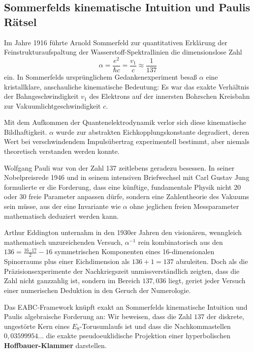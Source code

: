 \documentclass[11pt,a4paper]{article}
\theoremstyle{definition}
\theoremstyle{remark}
\numberwithin{equation}{section}
\begin{document}
\subsection{Sommerfelds kinematische Intuition und Paulis Rätsel}

Im Jahre 1916 führte Arnold Sommerfeld zur quantitativen Erklärung der Feinstrukturaufspaltung der Wasserstoff-Spektrallinien die dimensionslose Zahl
\begin{equation}
\alpha = \frac{e^2}{\hbar c} = \frac{v_1}{c} \approx \frac{1}{137}
\end{equation}
ein. In Sommerfelds ursprünglichem Gedankenexperiment besaß $\alpha$ eine kristallklare, anschauliche kinematische Bedeutung: Es war das exakte Verhältnis der Bahngeschwindigkeit $v_1$ des Elektrons auf der innersten Bohrschen Kreisbahn zur Vakuumlichtgeschwindigkeit $c$.

Mit dem Aufkommen der Quantenelektrodynamik verlor sich diese kinematische Bildhaftigkeit. $\alpha$ wurde zur abstrakten Eichkopplungskonstante degradiert, deren Wert bei verschwindendem Impulsübertrag experimentell bestimmt, aber niemals theoretisch verstanden werden konnte. 

Wolfgang Pauli war von der Zahl 137 zeitlebens geradezu besessen. In seiner Nobelpreisrede 1946 und in seinem intensiven Briefwechsel mit Carl Gustav Jung formulierte er die Forderung, dass eine künftige, fundamentale Physik nicht 20 oder 30 freie Parameter anpassen dürfe, sondern eine Zahlentheorie des Vakuums sein müsse, aus der eine Invariante wie $\alpha$ ohne jeglichen freien Messparameter mathematisch deduziert werden kann.

Arthur Eddington unternahm in den 1930er Jahren den visionären, wenngleich mathematisch unzureichenden Versuch, $\alpha^{-1}$ rein kombinatorisch aus den $136 = \frac{16 \cdot 17}{2} - 16$ symmetrischen Komponenten eines 16-dimensionalen Spinorraums plus einer Eichdimension als $136 + 1 = 137$ abzuleiten. Doch als die Präzisionsexperimente der Nachkriegszeit unmissverständlich zeigten, dass die Zahl nicht ganzzahlig ist, sondern im Bereich $137{,}036$ liegt, geriet jeder Versuch einer numerischen Deduktion in den Geruch der Numerologie.

Das EABC-Framework knüpft exakt an Sommerfelds kinematische Intuition und Paulis algebraische Forderung an: Wir beweisen, dass die Zahl $137$ der diskrete, ungestörte Kern eines $E_8$-Torusumlaufs ist und dass die Nachkommastellen $0{,}03599954\dots$ die exakte pseudoeuklidische Projektion einer hyperbolischen \textbf{Hoffbauer-Klammer} darstellen.
\end{document}
